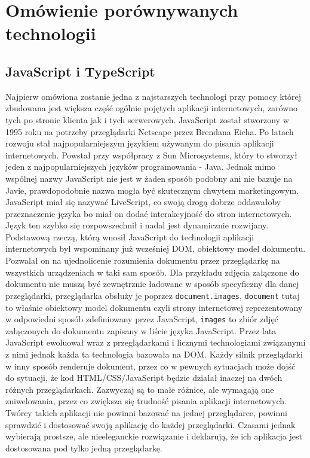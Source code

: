 \documentclass[12pt,a4paper,oneside]{book}
\begin{document}
\chapter{Omówienie porównywanych technologii}\label{ch_2}

\section{JavaScript i TypeScript}
Najpierw omówiona zostanie jedna z najstarszych technologi przy pomocy której zbudowana jest większa część ogólnie pojętych aplikacji internetowych, zarówno tych po stronie klienta jak i tych serwerowych. JavaScript został stworzony w 1995 roku na potrzeby przeglądarki Netscape przez Brendana Eicha. Po latach rozwoju stał najpopularniejszym językiem używanym do pisania aplikacji internetowych. Powstał przy współpracy z Sun Microsystems, który to stworzył jeden z najpopularniejszych języków programowania - Java. Jednak mimo wspólnej nazwy JavaScript nie jest w żaden sposób podobny ani nie bazuje na Javie, prawdopodobnie nazwa mogła być skutecznym chwytem marketingowym. JavaScript miał się nazywać LiveScript, co swoją drogą dobrze oddawałoby przeznaczenie języka bo miał on dodać interakcyjność do stron internetowych. Język ten szybko się rozpowszechnił i nadal jest dynamicznie rozwijany.
Podstawową rzeczą, którą wnosił JavaScript do technologii aplikacji internetowych był wspominany już wcześniej DOM, obiektowy model dokumentu. Pozwalał on na ujednolicenie rozumienia dokumentu przez przeglądarkę na wszystkich urządzeniach w taki sam sposób. Dla przykładu zdjęcia załączone do dokumentu nie muszą być zewnętrznie ładowane w sposób specyficzny dla danej przeglądarki, przeglądarka obsłuży je poprzez \texttt{document.images}, \texttt{document} tutaj to właśnie obiektowy model dokumentu czyli strony internetowej reprezentowany w odpowiedni sposób zdefiniowany przez JavaScript, \texttt{images} to zbiór zdjęć załączonych do dokumentu zapisany w liście języka JavaScript. Przez lata JavaScript ewoluował wraz z przeglądarkami i licznymi technologiami związanymi z nimi jednak każda ta technologia bazowała na DOM. Każdy silnik przeglądarki w inny sposób renderuje dokument, przez co w pewnych sytuacjach może dojść do sytuacji, że kod HTML/CSS/JavaScript będzie działał inaczej na dwóch różnych przeglądarkach. Zazwyczaj są to małe różnice, ale wymagają one zniwelowania, przez co zwiększa się trudność pisania aplikacji internetowych. Twórcy takich aplikacji nie powinni bazować na jednej przeglądarce, powinni sprawdzić i dostosować swoją aplikację do każdej przeglądarki. Czasami jednak wybierają prostsze, ale nieeleganckie rozwiązanie i deklarują, że ich aplikacja jest dostosowana pod tylko jedną przeglądarkę.
\end{document}
